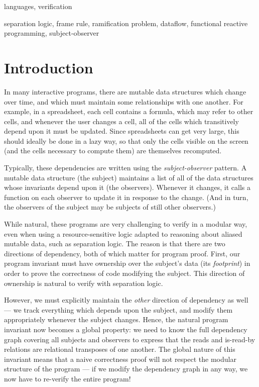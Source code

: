 \documentclass[natbib]{sigplanconf}
\begin{document}

\terms
languages, verification

\keywords
separation logic, frame rule, ramification problem, dataflow, 
functional reactive programming, subject-observer

\section{Introduction}

In many interactive programs, there are mutable data structures which
change over time, and which must maintain some relationships with one
another. For example, in a spreadsheet, each cell contains a formula,
which may refer to other cells, and whenever the user changes a cell,
all of the cells which transitively depend upon it must be
updated. Since spreadsheets can get very large, this should ideally be
done in a lazy way, so that only the cells visible on the screen (and
the cells necessary to compute them) are themselves recomputed.

Typically, these dependencies are written using the
\emph{subject-observer} pattern. A mutable data structure (the
subject) maintains a list of all of the data structures whose
invariants depend upon it (the observers). Whenever it changes, it
calls a function on each observer to update it in response
to the change. (And in turn, the observers of the subject may be
subjects of still other observers.)

While natural, these programs are very challenging to verify in a
modular way, even when using a resource-sensitive logic adapted to
reasoning about aliased mutable data, such as separation logic. The
reason is that there are two directions of dependency, both of which
matter for program proof. First, our program invariant must have
ownership over the subject's data (its \emph{footprint}) in order to
prove the correctness of code modifying the subject. This direction
of ownership is natural to verify with separation logic. 

However, we must explicitly maintain the \emph{other} direction of
dependency as well --- we track everything which depends upon the
subject, and modify them appropriately whenever the subject changes.
Hence, the natural program invariant now becomes a global property:
we need to know the full dependency graph covering all subjects and
observers to express that the reads and is-read-by relations
are relational transposes of one another. The global nature of this
invariant means that a naive correctness proof will not respect the
modular structure of the program --- if we modify the dependency graph
in any way, we now have to re-verify the entire program!
\end{document}
